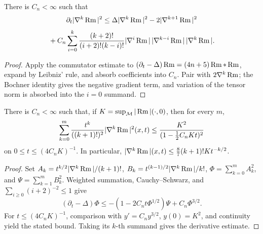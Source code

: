 \begin{lemma}
\label{lem:chow-ii-curvature-derivative-evolution-inequality}
There is \(C_n<\infty\) such that
\[
 \partial_t|\nabla^k\operatorname{Rm}|^2\leq\Delta|\nabla^k\operatorname{Rm}|^2
 -2|\nabla^{k+1}\operatorname{Rm}|^2
\]
\[
 {}+C_n\sum_{i=0}^k\frac{(k+2)!}{(i+2)!(k-i)!}
 |\nabla^i\operatorname{Rm}|\,|\nabla^{k-i}\operatorname{Rm}|\,|\nabla^k\operatorname{Rm}|.
\]
\end{lemma}
\begin{proof}
Apply the commutator estimate to
\((\partial_t-\Delta)\operatorname{Rm}=(4n+5)\operatorname{Rm}*\operatorname{Rm}\), expand by Leibniz' rule, and
absorb coefficients into \(C_n\).  Pair with \(2\nabla^k\operatorname{Rm}\); the Bochner
identity gives the negative gradient term, and variation of the tensor norm
is absorbed into the \(i=0\) summand.
\end{proof}

\begin{lemma}
\label{lem:chow-ii-main-factorial-curvature-estimate}
There is \(C_n<\infty\) such that, if
\(K=\sup_{\mathcal M}|\Rm|(\cdot,0)\), then for every \(m\),
\[
 \sum_{k=0}^m\frac{t^k}{((k+1)!)^2}|\nabla^k\operatorname{Rm}|^2(x,t)
 \leq\frac{K^2}{(1-\tfrac12C_nKt)^2}
\]
on \(0\leq t\leq(4C_nK)^{-1}\).  In particular,
\(|\nabla^k\operatorname{Rm}|(x,t)\leq\frac87(k+1)!Kt^{-k/2}\).
\end{lemma}
\begin{proof}
Set \(A_k=t^{k/2}|\nabla^k\operatorname{Rm}|/(k+1)!\),
\(B_k=t^{(k-1)/2}|\nabla^k\operatorname{Rm}|/k!\),
\(\Phi=\sum_{k=0}^mA_k^2\), and \(\Psi=\sum_{k=1}^mB_k^2\).
Weighted summation, Cauchy--Schwarz, and
\(\sum_{i\geq0}(i+2)^{-2}\leq1\) give
\[
 (\partial_t-\Delta)\Phi
 \leq-(1-2C_nt\Phi^{1/2})\Psi+C_n\Phi^{3/2}.
\]
For \(t\leq(4C_nK)^{-1}\), comparison with
\(y'=C_ny^{3/2}\), \(y(0)=K^2\), and continuity yield the stated bound.
Taking its \(k\)-th summand gives the derivative estimate.
\end{proof}

